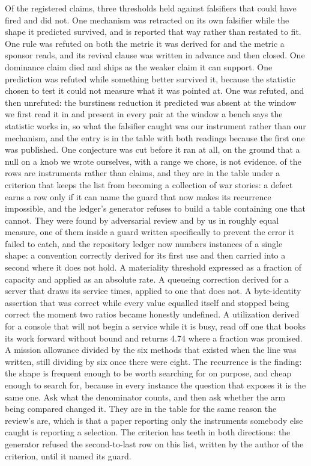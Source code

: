 \documentclass[11pt]{article}
\begin{document}
Of the \ldClaims{} registered claims, three thresholds held against falsifiers that could have fired and did not. One mechanism was retracted on its own falsifier while the shape it predicted survived, and is reported that way rather than restated to fit. One rule was refuted on both the metric it was derived for and the metric a sponsor reads, and its revival clause was written in advance and then closed. One dominance claim died and ships as the weaker claim it can support. One prediction was refuted while something better survived it, because the statistic chosen to test it could not measure what it was pointed at. One was refuted, and then unrefuted: the burstiness reduction it predicted was absent at the window we first read it in and present in every pair at the window a bench says the statistic works in, so what the falsifier caught was our instrument rather than our mechanism, and the entry is in the table with both readings because the first one was published. One conjecture was cut before it ran at all, on the ground that a null on a knob we wrote ourselves, with a range we chose, is not evidence. \ldInstr{} of the rows are instruments rather than claims, and they are in the table under a criterion that keeps the list from becoming a collection of war stories: a defect earns a row only if it can name the guard that now makes its recurrence impossible, and the ledger's generator refuses to build a table containing one that cannot. They were found by adversarial review and by us in roughly equal measure, one of them inside a guard written specifically to prevent the error it failed to catch, and the repository ledger now numbers \ldGenus{} instances of a single shape: a convention correctly derived for its first use and then carried into a second where it does not hold. A materiality threshold expressed as a fraction of capacity and applied as an absolute rate. A queueing correction derived for a server that draws its service times, applied to one that does not. A byte-identity assertion that was correct while every value equalled itself and stopped being correct the moment two ratios became honestly undefined. A utilization derived for a console that will not begin a service while it is busy, read off one that books its work forward without bound and returns 4.74 where a fraction was promised. A mission allowance divided by the six methods that existed when the line was written, still dividing by six once there were eight. The recurrence is the finding: the shape is frequent enough to be worth searching for on purpose, and cheap enough to search for, because in every instance the question that exposes it is the same one. Ask what the denominator counts, and then ask whether the arm being compared changed it. They are in the table for the same reason the review's are, which is that a paper reporting only the instruments somebody else caught is reporting a selection. The criterion has teeth in both directions: the generator refused the second-to-last row on this list, written by the author of the criterion, until it named its guard.
\end{document}
